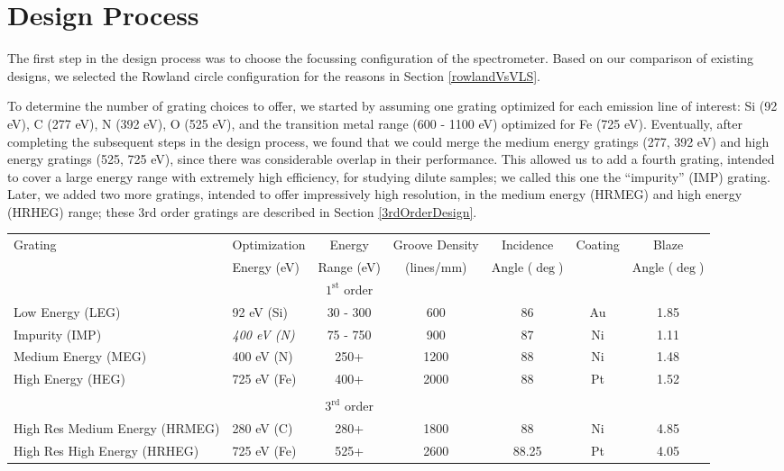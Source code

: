 \section{Design Process}
The first step in the design process was to choose the focussing configuration of the spectrometer.  Based on our comparison of existing designs, we selected the Rowland circle configuration for the reasons in Section \ref{rowlandVsVLS}.

To determine the number of grating choices to offer, we started by assuming one grating optimized for each emission line of interest: Si (92 eV), C (277 eV), N (392 eV), O (525 eV), and the transition metal range (600 - 1100 eV) optimized for Fe (725 eV).  Eventually, after completing the subsequent steps in the design process, we found that we could merge the medium energy gratings (277, 392 eV) and high energy gratings (525, 725 eV), since there was considerable overlap in their performance.  This allowed us to add a fourth grating, intended to cover a large energy range with extremely high efficiency, for studying dilute samples; we called this one the ``impurity'' (IMP) grating.  Later, we added two more gratings, intended to offer impressively high resolution, in the medium energy (HRMEG) and high energy (HRHEG) range; these 3rd order gratings are described in Section \ref{3rdOrderDesign}.

\renewcommand{\arraystretch}{1.3}
\begin{table}[h]
   \centering
   {\scriptsize
 \begin{tabularx}{\textwidth}{@{} Xlccccc@{}} %
\toprule
        Grating    & Optimization& Energy& Groove Density & Incidence & Coating & Blaze\\
        & Energy (eV) & Range (eV) & (lines/mm) & Angle ($\deg$) & &Angle ($\deg$)\\
\toprule
      &&$1^\textrm{st}$ order&&&&\\
\midrule
Low Energy (LEG) & 92 eV (Si) & 30 - 300&600&86&Au&1.85\\
Impurity (IMP) & \emph{400 eV (N)} & 75 - 750&900&87&Ni&1.11\\
Medium Energy (MEG) & 400 eV (N) & 250+&1200&88&Ni&1.48\\
High Energy (HEG) & 725 eV (Fe) & 400+&2000&88&Pt&1.52\\
&&&&&&\\
\toprule
 & &$3^\textrm{rd}$ order&&&&\\
\midrule
High Res Medium Energy (HRMEG) & 280 eV (C) & 280+&1800&88&Ni&4.85\\
High Res High Energy (HRHEG) & 725 eV (Fe) & 525+&2600&88.25&Pt&4.05\\
\bottomrule
   \end{tabularx}
   }
   \label{gratings-table}
\end{table}
\renewcommand{\arraystretch}{1.2}

